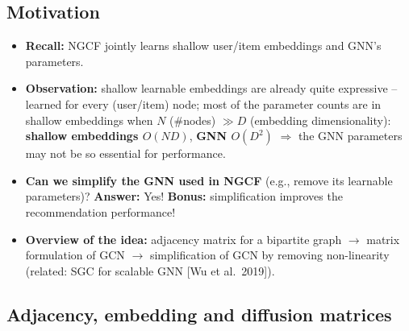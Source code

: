 \subsection{Motivation}\label{sec:lec11-lgcn-motiv}

\begin{itemize}
  \item \textbf{Recall:} NGCF jointly learns shallow user/item embeddings and
    GNN's parameters.
  \item \textbf{Observation:} shallow learnable embeddings are already quite
    expressive -- learned for every (user/item) node; most of the parameter
    counts are in shallow embeddings when $N$ (\#nodes) $\gg D$ (embedding
    dimensionality): \textbf{shallow embeddings $O(ND)$}, \textbf{GNN
    $O(D^2)$} $\Rightarrow$ the GNN parameters may not be so essential for
    performance.
  \item \textbf{Can we simplify the GNN used in NGCF} (e.g., remove its
    learnable parameters)? \textbf{Answer:} Yes! \textbf{Bonus:} simplification
    improves the recommendation performance!
  \item \textbf{Overview of the idea:} adjacency matrix for a bipartite graph
    $\to$ matrix formulation of GCN $\to$ simplification of GCN by removing
    non-linearity (related: SGC for scalable GNN [Wu et al.\ 2019]).
\end{itemize}

\subsection{Adjacency, embedding and diffusion matrices}\label{sec:lec11-matrices}

